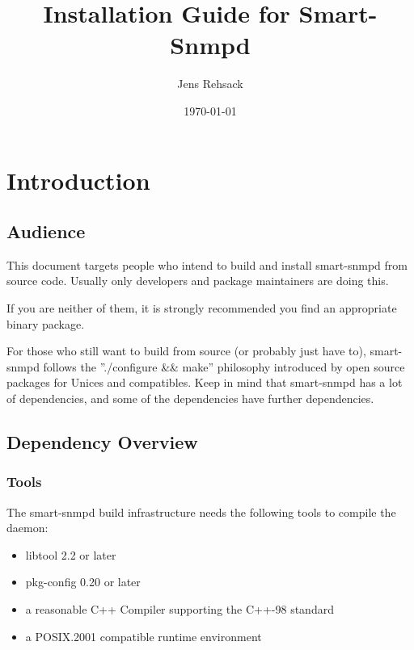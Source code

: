 \usepackage{hyperref}
\usepackage{longtable,tabularx,threeparttable}



\title{Installation Guide for Smart-Snmpd}

\author{Jens Rehsack}

\date{\today{}}

\maketitle

\tableofcontents

\section{Introduction}

\subsection{Audience}

This document targets people who intend to build and install smart-snmpd
from source code. Usually only developers and package maintainers are
doing this.

If you are neither of them, it is strongly recommended you find an
appropriate binary package.

For those who still want to build from source (or probably just have to),
smart-snmpd follows the ''./configure \&\& make'' philosophy introduced by
open source packages for Unices and compatibles. Keep in mind that
smart-snmpd has a lot of dependencies, and some of the dependencies have
further dependencies.

\subsection{Dependency Overview}

\subsubsection{Tools}

The smart-snmpd build infrastructure needs the following tools to compile
the daemon:

\begin{itemize}
\item{libtool 2.2 or later}
\item{pkg-config 0.20 or later}
\item{a reasonable C++ Compiler supporting the C++-98 standard}
\item{a POSIX.2001 compatible runtime environment}
\end{itemize}

